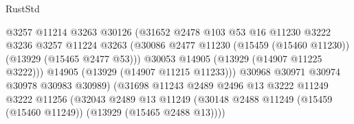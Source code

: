 \begin{lexlean}{RustStd}
\begin{coremodule}
                                            @3257
                                            @11214
                                            @3263
                                            @30126
                                            (@31652
                                              @2478
                                              @103
                                              @53
                                              @16
                                              @11230
                                              @3222
                                              @3236
                                              @3257
                                              @11224
                                              @3263
                                              (@30086
                                                @2477
                                                @11230
                                                (@15459 (@15460 @11230))
                                                (@13929 (@15465 @2477 @53)))
                                              @30053
                                              @14905
                                              (@13929 (@14907 @11225 @3222)))
                                            @14905
                                            (@13929 (@14907 @11215 @11233)))
                                          @30968
                                          @30971
                                          @30974
                                          @30978
                                          @30983
                                          @30989)
                                        (@31698
                                          @11243
                                          @2489
                                          @2496
                                          @13
                                          @3222
                                          @11249
                                          @3222
                                          @11256
                                          (@32043
                                            @2489
                                            @13
                                            @11249
                                            (@30148
                                              @2488
                                              @11249
                                              (@15459 (@15460 @11249))
                                              (@13929 (@15465 @2488 @13))))

\end{coremodule}
\end{lexlean}
